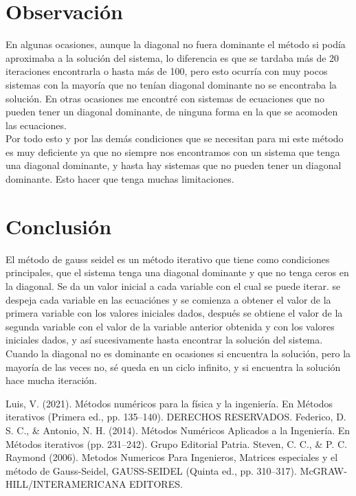 \documentclass[12pt]{article}
\begin{document}
		\section*{\centering Observación}\label{sec:Observacion}
			En algunas ocasiones, aunque la diagonal no fuera dominante el método si podía aproximaba a 
			la solución del sistema, lo diferencia es que se tardaba más de 20 iteraciones encontrarla o hasta 
			más de 100, pero esto ocurría con muy pocos sistemas con la mayoría que no tenían diagonal 
			dominante no se encontraba la solución.
			En otras ocasiones me encontré con sistemas de ecuaciones que no pueden tener un diagonal 
			dominante, de ninguna forma en la que se acomoden las ecuaciones. \\
			Por todo esto y por las demás condiciones que se necesitan para mi este método es muy 
			deficiente ya que no siempre nos encontramos con un sistema que tenga una diagonal dominante, 
			y hasta hay sistemas que no pueden tener un diagonal dominante. Esto hacer que tenga muchas 
			limitaciones.

		\section*{\centering Conclusión}\label{sec:Conclusion}
			El método de gauss seidel es un método iterativo que tiene como condiciones principales, que el sistema
			tenga una diagonal dominante y que no tenga ceros en la diagonal. Se da un valor inicial a cada 
			variable con el cual se puede iterar. se despeja cada variable en las ecuaciónes y se comienza a 
			obtener el valor de la primera variable con los valores iniciales dados, después se obtiene el valor 
			de la segunda variable con el valor de la variable anterior obtenida y con los valores iniciales 
			dados, y así sucesivamente hasta encontrar la solución del sistema. Cuando la diagonal no es 
			dominante en ocasiones si encuentra la solución, pero la mayoría de las veces no, sé queda en un 
			ciclo infinito, y si encuentra la solución hace mucha iteración.

		\centering
		\begin{thebibliography}{10}
			 Luis, V. (2021). Métodos numéricos para la física y la ingeniería. En Métodos iterativos (Primera ed., pp. 135–140). DERECHOS RESERVADOS.
			 Federico, D. S. C., \& Antonio, N. H. (2014). Métodos Numéricos Aplicados a la Ingeniería. En Métodos iterativos (pp. 231–242). Grupo Editorial Patria.
			 Steven, C. C., \& P. C. Raymond (2006). Metodos Numericos Para Ingenieros, Matrices especiales y el método de Gauss-Seidel, GAUSS-SEIDEL (Quinta ed., pp. 310–317). McGRAW-HILL/INTERAMERICANA EDITORES.
		\end{thebibliography}

	
\end{document}
